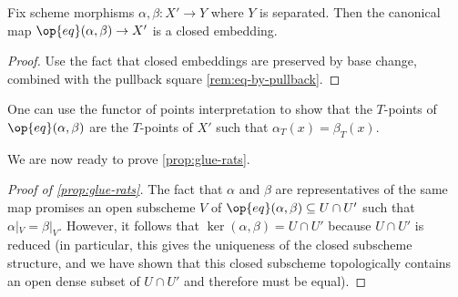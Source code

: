 \documentclass[../notes.tex]{subfiles}
\begin{document}
\begin{lemma}
	Fix scheme morphisms $\alpha,\beta\colon X'\to Y$ where $Y$ is separated. Then the canonical map $\op{eq}(\alpha,\beta)\to X'$ is a closed embedding.
\end{lemma}
\begin{proof}
	Use the fact that closed embeddings are preserved by base change, combined with the pullback square \autoref{rem:eq-by-pullback}.
\end{proof}
\begin{remark}
	One can use the functor of points interpretation to show that the $T$-points of $\op{eq}(\alpha,\beta)$ are the $T$-points of $X'$ such that $\alpha_T(x)=\beta_T(x)$.
\end{remark}
We are now ready to prove \autoref{prop:glue-rats}.
\begin{proof}[Proof of \autoref{prop:glue-rats}]
	The fact that $\alpha$ and $\beta$ are representatives of the same map promises an open subscheme $V$ of $\op{eq}(\alpha,\beta)\subseteq U\cap U'$ such that $\alpha|_V=\beta|_V$. However, it follows that $\ker(\alpha,\beta)=U\cap U'$ because $U\cap U'$ is reduced (in particular, this gives the uniqueness of the closed subscheme structure, and we have shown that this closed subscheme topologically contains an open dense subset of $U\cap U'$ and therefore must be equal).
\end{proof}
\end{document}
